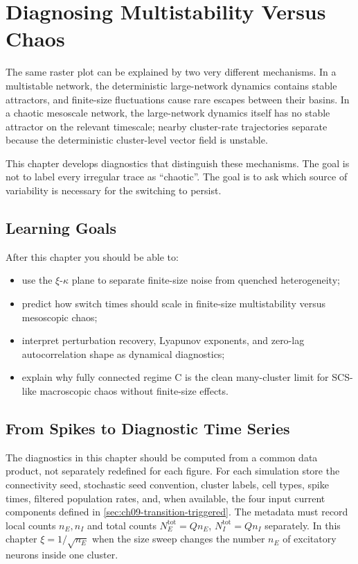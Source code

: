 \chapter{Diagnosing Multistability Versus Chaos}
\label{ch:diagnosing-multistability-chaos}

The same raster plot can be explained by two very different mechanisms. In a
multistable network, the deterministic large-network dynamics contains stable
attractors, and finite-size fluctuations cause rare escapes between their
basins. In a chaotic mesoscale network, the large-network dynamics itself has no
stable attractor on the relevant timescale; nearby cluster-rate trajectories
separate because the deterministic cluster-level vector field is unstable.

This chapter develops diagnostics that distinguish these mechanisms. The goal
is not to label every irregular trace as ``chaotic''. The goal is to ask which
source of variability is necessary for the switching to persist.

\section*{Learning Goals}

After this chapter you should be able to:
\begin{itemize}
    \item use the \(\xi\)-\(\kappa\) plane to separate finite-size noise from
    quenched heterogeneity;
    \item predict how switch times should scale in finite-size multistability
    versus mesoscopic chaos;
    \item interpret perturbation recovery, Lyapunov exponents, and zero-lag
    autocorrelation shape as dynamical diagnostics;
    \item explain why fully connected regime C is the clean many-cluster limit
    for SCS-like macroscopic chaos without finite-size effects.
\end{itemize}

\section{From Spikes to Diagnostic Time Series}
\label{sec:ch09-spikes-to-diagnostics}

The diagnostics in this chapter should be computed from a common data product,
not separately redefined for each figure. For each simulation store the
connectivity seed, stochastic seed convention, cluster labels, cell types,
spike times, filtered population rates, and, when available, the four input
current components defined in \cref{sec:ch09-transition-triggered}. The
metadata must record local counts \(n_E,n_I\) and total counts
\(N_E^{\mathrm{tot}}=Qn_E\), \(N_I^{\mathrm{tot}}=Qn_I\) separately. In this
chapter \(\xi=1/\sqrt{n_E}\) when the size sweep changes the number \(n_E\) of
excitatory neurons inside one cluster.

